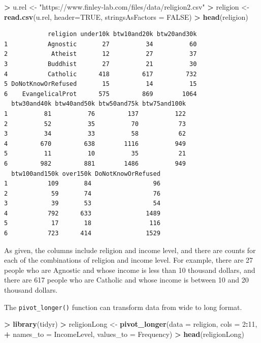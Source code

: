 \documentclass[
]{krantz}
\makeatletter
\newenvironment{Shaded}{\begin{snugshade}}{\end{snugshade}}
\newcommand{\DataTypeTok}[1]{\textcolor[rgb]{0.27,0.27,0.27}{#1}}
\newcommand{\DecValTok}[1]{\textcolor[rgb]{0.06,0.06,0.06}{#1}}
\newcommand{\KeywordTok}[1]{\textcolor[rgb]{0.27,0.27,0.27}{\textbf{#1}}}
\newcommand{\NormalTok}[1]{#1}
\newcommand{\OperatorTok}[1]{\textcolor[rgb]{0.43,0.43,0.43}{\textbf{#1}}}
\newcommand{\OtherTok}[1]{\textcolor[rgb]{0.37,0.37,0.37}{#1}}
\newcommand{\StringTok}[1]{\textcolor[rgb]{0.5,0.5,0.5}{#1}}
\newenvironment{kframe}{%
\medskip{}
\setlength{\fboxsep}{.8em}
 \def\at@end@of@kframe{}%
 \ifinner\ifhmode%
  \def\at@end@of@kframe{\end{minipage}}%
  \begin{minipage}{\columnwidth}%
 \fi\fi%
 \def\FrameCommand##1{\hskip\@totalleftmargin \hskip-\fboxsep
 \colorbox{shadecolor}{##1}\hskip-\fboxsep
     \hskip-\linewidth \hskip-\@totalleftmargin \hskip\columnwidth}%
 \MakeFramed {\advance\hsize-\width
   \@totalleftmargin\z@ \linewidth\hsize
   \@setminipage}}%
 {\par\unskip\endMakeFramed%
 \at@end@of@kframe}
\renewenvironment{Shaded}{\begin{kframe}}{\end{kframe}}
\makeatother
\begin{document}
\begin{Shaded}
\begin{Highlighting}[]
\OperatorTok{\textgreater{}}\StringTok{ }\NormalTok{u.rel \textless{}{-}}\StringTok{ "https://www.finley{-}lab.com/files/data/religion2.csv"}
\OperatorTok{\textgreater{}}\StringTok{ }\NormalTok{religion \textless{}{-}}\StringTok{ }\KeywordTok{read.csv}\NormalTok{(u.rel, }\DataTypeTok{header=}\OtherTok{TRUE}\NormalTok{, }\DataTypeTok{stringsAsFactors =} \OtherTok{FALSE}\NormalTok{)}
\OperatorTok{\textgreater{}}\StringTok{ }\KeywordTok{head}\NormalTok{(religion)}
\end{Highlighting}
\end{Shaded}

\begin{verbatim}
            religion under10k btw10and20k btw20and30k
1           Agnostic       27          34          60
2            Atheist       12          27          37
3           Buddhist       27          21          30
4           Catholic      418         617         732
5 DoNotKnowOrRefused       15          14          15
6    EvangelicalProt      575         869        1064
  btw30and40k btw40and50k btw50and75k btw75and100k
1          81          76         137          122
2          52          35          70           73
3          34          33          58           62
4         670         638        1116          949
5          11          10          35           21
6         982         881        1486          949
  btw100and150k over150k DoNotKnowOrRefused
1           109       84                 96
2            59       74                 76
3            39       53                 54
4           792      633               1489
5            17       18                116
6           723      414               1529
\end{verbatim}

As given, the columns include religion and income level, and there are counts for each of the combinations of religion and income level. For example, there are 27 people who are Agnostic and whose income is less than 10 thousand dollars, and there are 617 people who are Catholic and whose income is between 10 and 20 thousand dollars.

The \texttt{pivot\_longer()} function can transform data from wide to long format.

\begin{Shaded}
\begin{Highlighting}[]
\OperatorTok{\textgreater{}}\StringTok{ }\KeywordTok{library}\NormalTok{(tidyr)}
\OperatorTok{\textgreater{}}\StringTok{ }\NormalTok{religionLong \textless{}{-}}\StringTok{ }\KeywordTok{pivot\_longer}\NormalTok{(}\DataTypeTok{data =}\NormalTok{ religion, }\DataTypeTok{cols =} \DecValTok{2}\OperatorTok{:}\DecValTok{11}\NormalTok{, }
\OperatorTok{+}\StringTok{                }\DataTypeTok{names\_to =} \StringTok{\textquotesingle{}IncomeLevel\textquotesingle{}}\NormalTok{, }\DataTypeTok{values\_to =} \StringTok{\textquotesingle{}Frequency\textquotesingle{}}\NormalTok{)}
\OperatorTok{\textgreater{}}\StringTok{ }\KeywordTok{head}\NormalTok{(religionLong)}
\end{Highlighting}
\end{Shaded}
\end{document}
